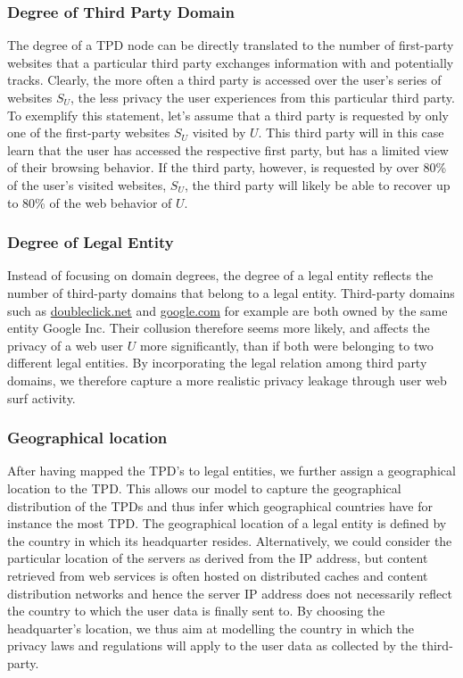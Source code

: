 \documentclass[compsoc, conference, letterpaper, 10pt, times]{IEEEtran}
\begin{document}
\subsubsection{Degree of Third Party Domain}
The degree of a TPD node can be directly translated to the number of first-party websites that a particular third party exchanges information with and potentially tracks. Clearly, the more often a third party is accessed over the user's series of websites $S_U$, the less privacy the user experiences from this particular third party. To exemplify this statement, let's assume that a third party is requested by only one of the first-party websites $S_U$ visited by $U$. This third party will in this case learn that the user has accessed the respective first party, but has a limited view of their browsing behavior. If the third party, however, is requested by over 80\% of the user's visited websites, $S_U$, the third party will likely be able to recover up to 80\% of the web behavior of $U$.


\subsubsection{Degree of Legal Entity}
\label{sec:legal_entity}
Instead of focusing on domain degrees, the degree of a legal entity reflects the number of third-party domains that belong to a legal entity. Third-party domains such as \url{doubleclick.net} and \url{google.com} for example are both owned by the same entity Google Inc. Their collusion therefore seems more likely, and affects the privacy of a web user $U$ more significantly, than if both were belonging to two different legal entities. By incorporating the legal relation among third party domains, we therefore capture a more realistic privacy leakage through user web surf activity.

\subsubsection{Geographical location}
After having mapped the TPD's to legal entities, we further assign a geographical location to the TPD. This allows our model to capture the geographical distribution of the TPDs and thus infer which geographical countries have for instance the most TPD. The geographical location of a legal entity is defined by the country in which its headquarter resides. Alternatively, we could consider the particular location of the servers as derived from the IP address, but content retrieved from web services is often hosted on distributed caches and content distribution networks and hence the server IP address does not necessarily reflect the country to which the user data is finally sent to. By choosing the headquarter's location, we thus aim at modelling the country in which the privacy laws and regulations will apply to the user data as collected by the third-party.
\end{document}
